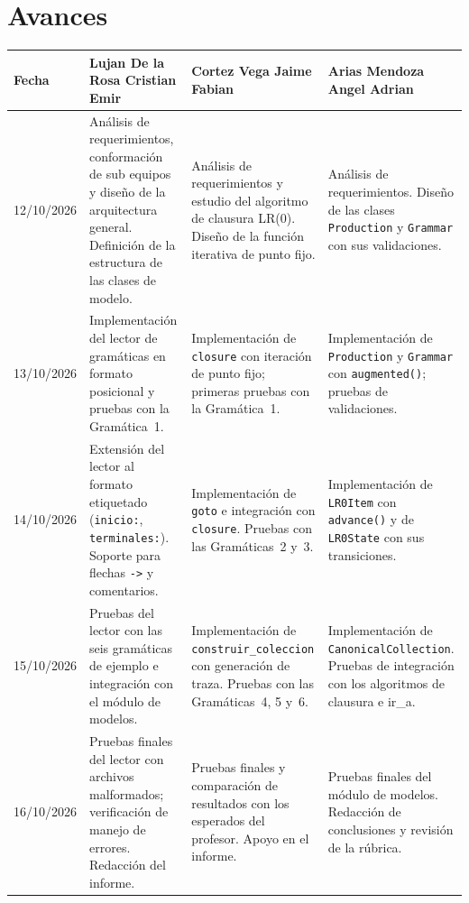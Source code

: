 \section{Avances}

\scriptsize
\begin{longtable}{|P{1.8cm}|P{4.4cm}|P{4.4cm}|P{4.4cm}|}
\hline
{}
{\color{white}\textbf{Fecha}} &
{\color{white}\textbf{Lujan De la Rosa Cristian Emir}} &
{\color{white}\textbf{Cortez Vega Jaime Fabian}} &
{\color{white}\textbf{Arias Mendoza Angel Adrian}} \\
\hline
\endhead

12/10/2026 &
  Análisis de requerimientos, conformación de sub equipos y diseño de la arquitectura
  general. Definición de la estructura de las clases de modelo. &
  Análisis de requerimientos y estudio del algoritmo de clausura LR(0). Diseño de la
  función iterativa de punto fijo. &
  Análisis de requerimientos. Diseño de las clases \texttt{Production} y
  \texttt{Grammar} con sus validaciones. \\[3pt]
\hline

13/10/2026 &
  Implementación del lector de gramáticas en formato posicional y pruebas con la
  Gramática~1. &
  Implementación de \texttt{closure} con iteración de punto fijo; primeras pruebas
  con la Gramática~1. &
  Implementación de \texttt{Production} y \texttt{Grammar} con \texttt{augmented()};
  pruebas de validaciones. \\[3pt]
\hline

14/10/2026 &
  Extensión del lector al formato etiquetado (\texttt{inicio:}, \texttt{terminales:}).
  Soporte para flechas \texttt{->} y comentarios. &
  Implementación de \texttt{goto} e integración con \texttt{closure}. Pruebas con
  las Gramáticas~2 y~3. &
  Implementación de \texttt{LR0Item} con \texttt{advance()} y de \texttt{LR0State}
  con sus transiciones. \\[3pt]
\hline

15/10/2026 &
  Pruebas del lector con las seis gramáticas de ejemplo e integración con el módulo
  de modelos. &
  Implementación de \texttt{construir\_coleccion} con generación de traza. Pruebas
  con las Gramáticas~4, 5 y~6. &
  Implementación de \texttt{CanonicalCollection}. Pruebas de integración con los
  algoritmos de clausura e ir\_a. \\[3pt]
\hline

16/10/2026 &
  Pruebas finales del lector con archivos malformados; verificación de manejo de
  errores. Redacción del informe. &
  Pruebas finales y comparación de resultados con los esperados del profesor.
  Apoyo en el informe. &
  Pruebas finales del módulo de modelos. Redacción de conclusiones y revisión de
  la rúbrica. \\[3pt]
\hline

\end{longtable}

